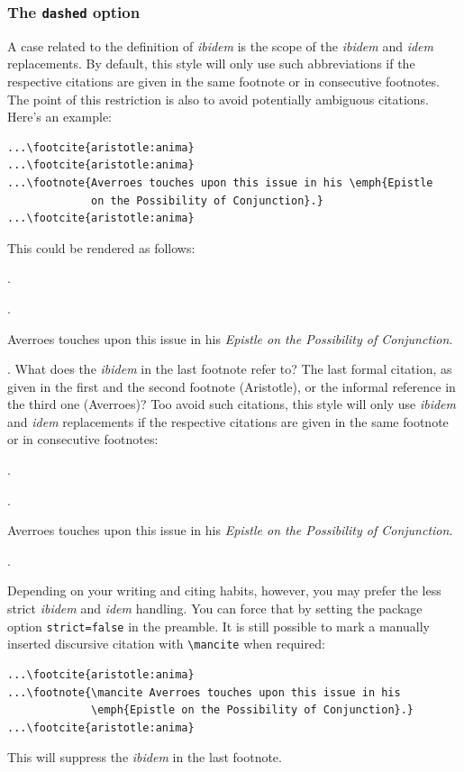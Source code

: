 \documentclass[a4paper]{article}
\newcommand{\cmd}[1]{\texttt{\textbackslash #1}}
\newenvironment*{pseudofootnotes}
  {\list\labelenumi{%
     \def\makelabel##1{\hss\llap{##1}}%
     \def\labelenumi{\theenumi}%
     \usecounter{enumi}%
     \setlength{\leftmargin}{0pt}%
     \setlength{\labelsep}{0.75em}%
     \setlength{\itemsep}{0pt}%
     \setlength{\parsep}{0pt}}%
   \citereset
   \footnotesize
   \def\footcite##1{\item\Cite{##1}.}%
   \def\footnote##1{\item##1}}
  {\endlist}
\newenvironment*{pseudofootnotes*}
  {\pseudofootnotes
   \def\footnote##1{\item##1\mancite}}
  {\endpseudofootnotes}
\begin{document}
\subsubsection*{The \texttt{dashed} option}

A case related to the definition of \emph{ibidem} is the scope of
the \emph{ibidem} and \emph{idem} replacements. By default, this
style will only use such abbreviations if the respective citations
are given in the same footnote or in consecutive footnotes. The
point of this restriction is also to avoid potentially ambiguous
citations. Here's an example:

\begin{verbatim}
...\footcite{aristotle:anima}
...\footcite{aristotle:anima}
...\footnote{Averroes touches upon this issue in his \emph{Epistle
             on the Possibility of Conjunction}.}
...\footcite{aristotle:anima}
\end{verbatim}
%
This could be rendered as follows:

\begin{pseudofootnotes}
\footcite{aristotle:anima}
\footcite{aristotle:anima}
\footnote{Averroes touches upon this issue in his \emph{Epistle on
the Possibility of Conjunction}.}
\footcite{aristotle:anima}
\end{pseudofootnotes}
%
What does the \emph{ibidem} in the last footnote refer to? The last
formal citation, as given in the first and the second footnote
(Aristotle), or the informal reference in the third one (Averroes)?
Too avoid such citations, this style will only use \emph{ibidem} and
\emph{idem} replacements if the respective citations are given in
the same footnote or in consecutive footnotes:

\begin{pseudofootnotes*}
\footcite{aristotle:anima}
\footcite{aristotle:anima}
\footnote{Averroes touches upon this issue in his \emph{Epistle on
the Possibility of Conjunction}.}
\footcite{aristotle:anima}
\end{pseudofootnotes*}
%
Depending on your writing and citing habits, however, you may prefer
the less strict \emph{ibidem} and \emph{idem} handling. You can
force that by setting the package option \texttt{strict=false} in
the preamble. It is still possible to mark a manually inserted
discursive citation with \cmd{mancite} when required:

\begin{verbatim}
...\footcite{aristotle:anima}
...\footnote{\mancite Averroes touches upon this issue in his
             \emph{Epistle on the Possibility of Conjunction}.}
...\footcite{aristotle:anima}
\end{verbatim}
%
This will suppress the \emph{ibidem} in the last footnote.
\end{document}
